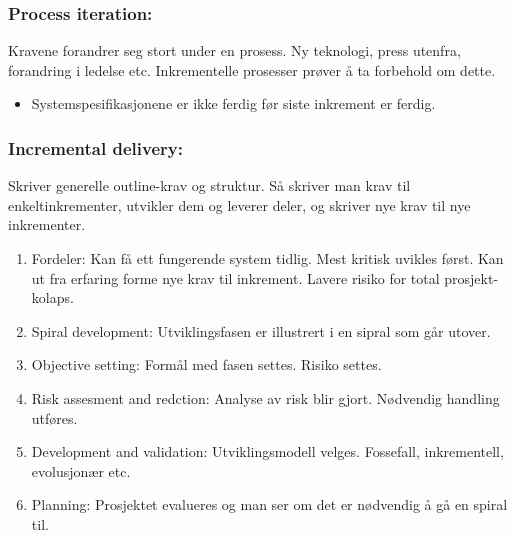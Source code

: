 \documentclass[11pt]{article}
\begin{document}
\subsubsection{Process iteration:}
\label{sec-4.1.4}

    Kravene forandrer seg stort under en prosess. Ny teknologi, press utenfra, forandring i ledelse etc. 
    Inkrementelle prosesser prøver å ta forbehold om dette.
\begin{itemize}
\item Systemspesifikasjonene er ikke ferdig før siste inkrement er ferdig.
\end{itemize}
\subsubsection{Incremental delivery:}
\label{sec-4.1.5}

    Skriver generelle outline-krav og struktur. Så skriver man krav til enkeltinkrementer, utvikler dem og leverer deler, og skriver nye krav til nye inkrementer.
\begin{enumerate}
\item Fordeler: 
      Kan få ett fungerende system tidlig. Mest kritisk uvikles først. 
      Kan ut fra erfaring forme nye krav til inkrement. Lavere risiko for total prosjekt-kolaps.
\item Spiral development: 
      Utviklingsfasen er illustrert i en sipral som går utover.
\item Objective setting: 
       Formål med fasen settes. Risiko settes.
\item Risk assesment and redction: 
       Analyse av risk blir gjort. Nødvendig handling utføres.
\item Development and validation: 
       Utviklingsmodell velges. Fossefall, inkrementell, evolusjonær etc.
\item Planning: 
       Prosjektet evalueres og man ser om det er nødvendig å gå en spiral til.
\end{enumerate}
\end{document}
